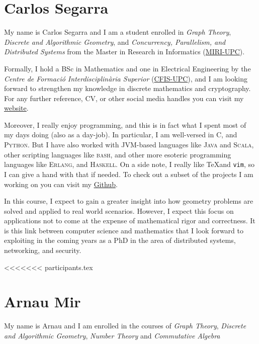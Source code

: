 \documentclass[11pt]{amsart}
\begin{document}
\section*{Carlos Segarra}

My name is Carlos Segarra and I am a student enrolled in \textit{Graph Theory}, \textit{Discrete and Algorithmic Geometry}, and \textit{Concurrency, Parallelism, and Distributed Systems} from the Master in Research in Informatics (\href{https://www.fib.upc.edu/en/studies/masters/master-innovation-and-research-informatics}{MIRI-UPC}).

Formally, I hold a BSc in Mathematics and one in Electrical Engineering by the \textit{Centre de Formaci\'o Interdisciplin\`aria Superior} (\href{https://cfis.upc.edu}{CFIS-UPC}), and I am looking forward to strengthen my knowledge in discrete mathematics and cryptography.
For any further reference, CV, or other social media handles you can visit my \href{https://carlossegarra.com}{website}.

Moreover, I really enjoy programming, and this is in fact what I spent most of my days doing (also as a day-job).
In particular, I am well-versed in \textsc{C}, and \textsc{Python}.
But I have also worked with JVM-based languages like \textsc{Java} and \textsc{Scala}, other scripting languages like \textsc{bash}, and other more esoteric programming languages like \textsc{Erlang}, and \textsc{Haskell}. 
On a side note, I really like \TeX and \texttt{vim}, so I can give a hand with that if needed.
To check out a subset of the projects I am working on you can visit my \href{https://github.com/csegarragonz}{Github}.

In this course, I expect to gain a greater insight into how geometry problems are solved and applied to real world scenarios.
However, I expect this focus on applications not to come at the expense of mathematical rigor and correctness.
It is this link between computer science and mathematics that I look forward to exploiting in the coming years as a PhD in the area of distributed systems, networking, and security.

\medskip

<<<<<<< participants.tex
\section*{Arnau Mir}
My name is Arnau and I am enrolled in the courses of \textit{Graph Theory}, \textit{Discrete and Algorithmic Geometry}, \textit{Number Theory} and \textit{Commutative Algebra}
\end{document}
